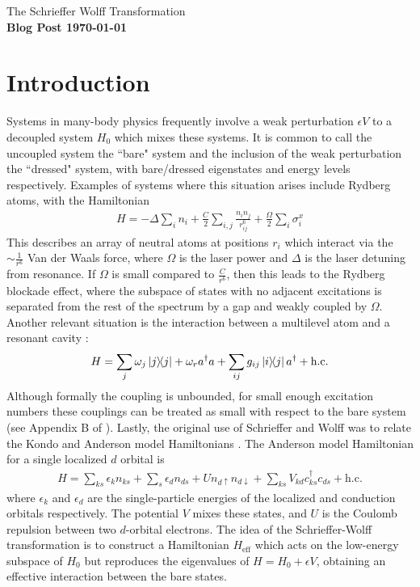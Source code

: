\documentclass[11pt]{article}
\begin{document}
\noindent\huge{The Schrieffer Wolff Transformation} \\
\normalsize\textbf{Blog Post \today}
\section{Introduction}
Systems in many-body physics frequently involve a weak perturbation $\epsilon V$ to a decoupled system $H_0$ which mixes these systems. It is common to call the uncoupled system the ``bare" system and the inclusion of the weak perturbation the ``dressed" system, with bare/dressed eigenstates and energy levels respectively. Examples of systems where this situation arises include Rydberg atoms, with the Hamiltonian \cite{bernien2017probing}
\begin{align}
    H = -\Delta\sum_{i}n_i + \frac{C}{2}\sum_{i,j}\frac{n_in_j}{r_{ij}^6} + \frac{\Omega}{2} \sum_i \sigma^x_i
\end{align}
This describes an array of neutral atoms at positions $r_i$ which interact via the $\sim \frac{1}{r^6}$ Van der Waals force, where $\Omega$ is the laser power and $\Delta$ is the laser detuning from resonance. If $\Omega$ is small compared to $\frac{C}{r^6}$, then this leads to the Rydberg blockade effect, where the subspace of states with no adjacent excitations is separated from the rest of the spectrum by a gap and weakly coupled by $\Omega$. Another relevant situation is the interaction between a multilevel atom and a resonant cavity \cite{blais2021circuit}:
\begin{align}
    H = \sum_{j}\omega_j\ketbra{j}{j} + \omega_r a^\dagger a + \sum_{ij}g_{ij}\ketbra{i}{j}a^\dagger + \text{h.c.}
\end{align}
Although formally the coupling is unbounded, for small enough excitation numbers these couplings can be treated as small with respect to the bare system (see Appendix B of \cite{blais2021circuit}). Lastly, the original use of Schrieffer and Wolff was to relate the Kondo and Anderson model Hamiltonians \cite{schrieffer1966relation}. The Anderson model Hamiltonian for a single localized $d$ orbital is
\begin{align}
H = \sum_{ks}\epsilon_k n_{ks} + \sum_s \epsilon_d n_{ds} + U n_{d\uparrow} n_{d\downarrow} + \sum_{ks}V_{kd} c_{ks}^\dagger c_{ds} + \text{h.c.}
\end{align}
where $\epsilon_k$ and $\epsilon_d$ are the single-particle energies of the localized and conduction orbitals respectively. The potential $V$ mixes these states, and $U$ is the Coulomb repulsion between two $d$-orbital electrons. The idea of the Schrieffer-Wolff transformation is to construct a Hamiltonian $H_{\text{eff}}$ which acts on the low-energy subspace of $H_0$ but reproduces the eigenvalues of $H = H_0 + \epsilon V$, obtaining an effective interaction between the bare states.
\end{document}
